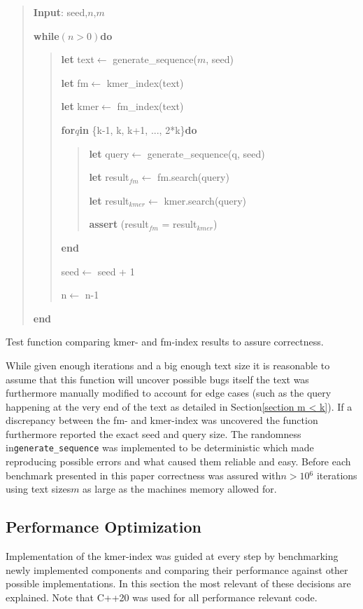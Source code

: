 \begin{algorithm}[H]
\begin{verse}
\textbf{Input}: seed,$n$,$m$

\textbf{while}$(n>0)$\textbf{do}
\begin{verse}
\textbf{let} text$\leftarrow$ generate\_sequence($m$, seed)

\textbf{let} fm$\leftarrow$ kmer\_index(text)

\textbf{let} kmer$\leftarrow$ fm\_index(text)

\textbf{for}$q$\textbf{in} \{k-1, k, k+1, ..., 2{*}k\}\textbf{do}
\begin{verse}
\textbf{let} query$\leftarrow$ generate\_sequence(q, seed)

\textbf{let} result$_{fm}$$\leftarrow$ fm.search(query)

\textbf{let} result$_{kmer}$$\leftarrow$ kmer.search(query)

\textbf{assert} (result$_{fm}$ = result$_{kmer}$)
\end{verse}
\textbf{end}

seed$\leftarrow$ seed + 1

n$\leftarrow$ n-1
\end{verse}
\textbf{end}
\end{verse}
\caption{Test function comparing kmer- and fm-index results to assure correctness.}
\end{algorithm}

While given enough iterations and a big enough text size it is reasonable
to assume that this function will uncover possible bugs itself the
text was furthermore manually modified to account for edge cases (such
as the query happening at the very end of the text as detailed in
Section\ref{section m < k}). If a discrepancy between the fm- and
kmer-index was uncovered the function furthermore reported the exact
seed and query size. The randomness in\lstinline{generate_sequence}
was implemented to be deterministic which made reproducing possible
errors and what caused them reliable and easy. Before each benchmark
presented in this paper correctness was assured with$n>10{{}^6}$
iterations using text sizes$m$ as large as the machines memory allowed
for.

\subsection{Performance Optimization}

Implementation of the kmer-index was guided at every step by benchmarking
newly implemented components and comparing their performance against
other possible implementations. In this section the most relevant
of these decisions are explained. Note that C++20 was used for all
performance relevant code.

